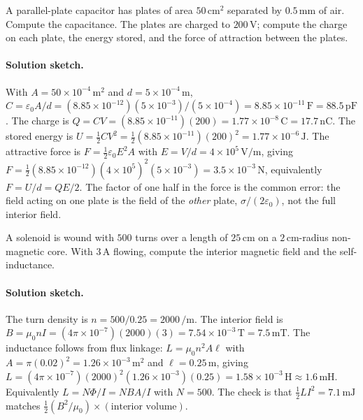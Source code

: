 \begin{exercise}
A parallel-plate capacitor has plates of area $50\,\si{\centi\meter
\squared}$ separated by $0.5\,\si{\milli\meter}$ of air. Compute the
capacitance. The plates are charged to $200\,\si{\volt}$; compute the
charge on each plate, the energy stored, and the force of attraction
between the plates.

\paragraph{Solution sketch.} With $A = 50\times 10^{-4}\,\si{\meter
\squared}$ and $d = 5\times 10^{-4}\,\si{\meter}$, $C = \varepsilon_0
A/d = (8.85\times 10^{-12})(5\times 10^{-3})/(5\times 10^{-4}) =
8.85\times 10^{-11}\,\si{\farad} = 88.5\,\si{\pico\farad}$. The charge
is $Q = CV = (8.85\times 10^{-11})(200) = 1.77\times 10^{-8}\,\si{
\coulomb} = 17.7\,\si{\nano\coulomb}$. The stored energy is $U =
\tfrac12 CV^2 = \tfrac12(8.85\times 10^{-11})(200)^2 = 1.77\times
10^{-6}\,\si{\joule}$. The attractive force is $F = \tfrac12
\varepsilon_0 E^2 A$ with $E = V/d = 4\times 10^{5}\,\si{\volt\per
\meter}$, giving $F = \tfrac12(8.85\times 10^{-12})(4\times 10^5)^2
(5\times 10^{-3}) = 3.5\times 10^{-3}\,\si{\newton}$, equivalently
$F = U/d = QE/2$. The factor of one half in the force is the common
error: the field acting on one plate is the field of the \emph{other}
plate, $\sigma/(2\varepsilon_0)$, not the full interior field.
\end{exercise}

\begin{exercise}
A solenoid is wound with $500$ turns over a length of $25\,\si{\centi
\meter}$ on a $2\,\si{\centi\meter}$-radius non-magnetic core. With
$3\,\si{\ampere}$ flowing, compute the interior magnetic field and the
self-inductance.

\paragraph{Solution sketch.} The turn density is $n = 500/0.25 = 2000\,
\si{\per\meter}$. The interior field is $B = \mu_0 n I = (4\pi\times
10^{-7})(2000)(3) = 7.54\times 10^{-3}\,\si{\tesla} = 7.5\,\si{\milli
\tesla}$. The inductance follows from flux linkage: $L = \mu_0 n^2 A
\ell$ with $A = \pi(0.02)^2 = 1.26\times 10^{-3}\,\si{\meter\squared}$
and $\ell = 0.25\,\si{\meter}$, giving $L = (4\pi\times 10^{-7})(2000)^2
(1.26\times 10^{-3})(0.25) = 1.58\times 10^{-3}\,\si{\henry} \approx
1.6\,\si{\milli\henry}$. Equivalently $L = N\Phi/I = N B A/I$ with
$N = 500$. The check is that $\tfrac12 LI^2 = 7.1\,\si{\milli\joule}$
matches $\tfrac12(B^2/\mu_0)\times(\text{interior volume})$.
\end{exercise}

